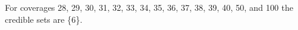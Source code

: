 For coverages 28, 29, 30, 31, 32, 33, 34, 35, 36, 37, 38, 39, 40, 50, and 100 the credible sets are \{6\}. 
